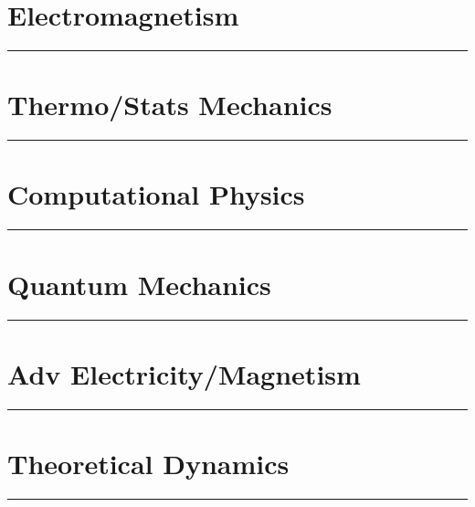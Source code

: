 \documentclass[10pt,titlepage]{asmath}
\newcommand{\hdiv}[3]{
  \vspace{#1}%
  \noindent\rule{\textwidth}{#2}%
  \vspace{#3}%
}
\theoremstyle{definition}
\begin{document}
\newpage
\part{Electromagnetism}
\label{prt:electromagnetism}
\hdiv{10pt}{2pt}{10pt}
\begin{multicols}{2}
  
\end{multicols}

\newpage
\part{Thermo/Stats Mechanics}
\label{prt:thermo_stats_mechanics}
\hdiv{10pt}{2pt}{10pt}
\begin{multicols}{2}
  
\end{multicols}

\newpage
\part{Computational Physics}
\label{prt:computational_physics}
\hdiv{10pt}{2pt}{10pt}
\begin{multicols}{2}
  
\end{multicols}

\newpage
\part{Quantum Mechanics}
\label{prt:quantum_mechanics}
\hdiv{10pt}{2pt}{10pt}
\begin{multicols}{2}
  
\end{multicols}

\newpage
\part{Adv Electricity/Magnetism}
\label{prt:adv_electricity_magnetism}
\hdiv{10pt}{2pt}{10pt}
\begin{multicols}{2}
  
\end{multicols}

\newpage
\part{Theoretical Dynamics}
\label{prt:theoretical_dynamics}
\hdiv{10pt}{2pt}{10pt}
\begin{multicols}{2}
  
\end{multicols}
\end{document}
